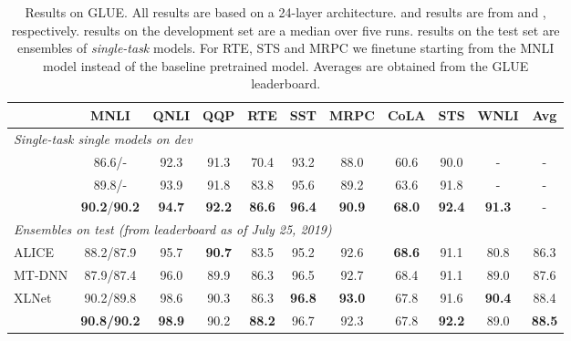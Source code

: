 \begin{table*}[t]
\begin{center}
\begin{tabular}{lcccccccccc}
\toprule
& \bf MNLI & \bf QNLI & \bf QQP & \bf RTE & \bf SST & \bf MRPC & \bf CoLA & \bf STS & \bf WNLI & \bf Avg \\
\midrule 
\multicolumn{10}{l}{\textit{Single-task single models on dev}}\\
\bertlarge{} & 86.6/- & 92.3 & 91.3 & 70.4 & 93.2 & 88.0 & 60.6 & 90.0 & - & -\\
\xlnetlarge{} & 89.8/- & 93.9 & 91.8 & 83.8 & 95.6 & 89.2 & 63.6 & 91.8 & - & -\\
\ourmodel{} & \textbf{90.2}/\textbf{90.2} & \textbf{94.7} & \textbf{92.2} & \textbf{86.6} & \textbf{96.4} & \textbf{90.9} & \textbf{68.0} & \textbf{92.4} & \textbf{91.3} & - \\
\midrule
\multicolumn{10}{l}{\textit{Ensembles on test (from leaderboard as of July 25, 2019)}} \\
ALICE & 88.2/87.9 & 95.7 & \textbf{90.7} & 83.5 & 95.2 & 92.6 & \textbf{68.6} & 91.1 & 80.8 & 86.3 \\
MT-DNN & 87.9/87.4 & 96.0 & 89.9 & 86.3 & 96.5 & 92.7 & 68.4 & 91.1 & 89.0 & 87.6 \\
XLNet  & 90.2/89.8 & 98.6 & 90.3 & 86.3 & \textbf{96.8} & \textbf{93.0} & 67.8 & 91.6 & \textbf{90.4} & 88.4 \\
\ourmodel{} & \textbf{90.8/90.2} & \textbf{98.9} & 90.2 & \textbf{88.2} & 96.7 & 92.3 & 67.8 & \textbf{92.2} & 89.0 & \bf 88.5 \\
\bottomrule
\end{tabular}
\end{center}
\caption{
Results on GLUE. All results are based on a 24-layer architecture.
\bertlarge{} and \xlnetlarge{} results are from  and , respectively.
\ourmodel{} results on the development set are a median over five runs.
\ourmodel{} results on the test set are ensembles of \emph{single-task} models.
For RTE, STS and MRPC we finetune starting from the MNLI model instead of the baseline pretrained model.
Averages are obtained from the GLUE leaderboard.
}
\label{tab:roberta_glue}
\end{table*}
